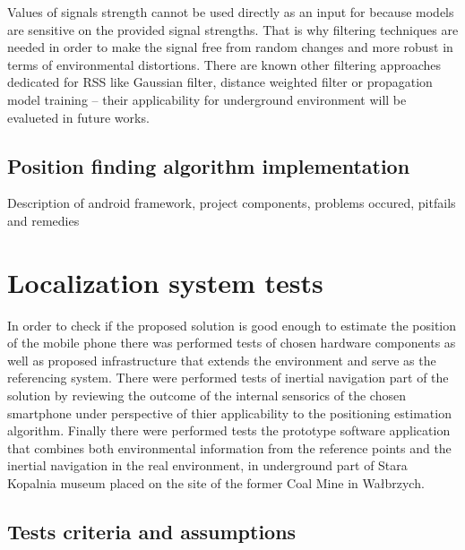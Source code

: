 \documentclass[../main.tex]{subfiles}
\begin{document}
Values of signals strength cannot be used directly as an input for because models are sensitive on the provided signal strengths. That is why filtering techniques are needed in order to make the signal free from random changes and more robust in terms of environmental distortions. There are known other filtering approaches dedicated for RSS like Gaussian filter, distance weighted filter or propagation model training \cite{article_rssi_learning_and_filtering_for_navi} -- their applicability for underground environment will be evalueted in future works.


\section{Position finding algorithm implementation} %
\label{sec:simple_position_finding_algorithm_implementation}

Description of android framework, project components, problems occured, pitfails and remedies

\chapter{Localization system tests}

In order to check if the proposed solution is good enough to estimate the position of the mobile phone there was performed tests of chosen hardware components as well as proposed infrastructure that extends the environment and serve as the referencing system. There were performed tests of inertial navigation part of the solution by reviewing the outcome of the internal sensorics of the chosen smartphone under perspective of thier applicability to the positioning estimation algorithm. Finally there were performed tests the prototype software application that combines both environmental information from the reference points and the inertial navigation in the real environment, in underground part of Stara Kopalnia museum placed on the site of the former Coal Mine in Wałbrzych.

\section{Tests criteria and assumptions} %
\label{sec:tests_criteria_and_assumptions}
\end{document}
